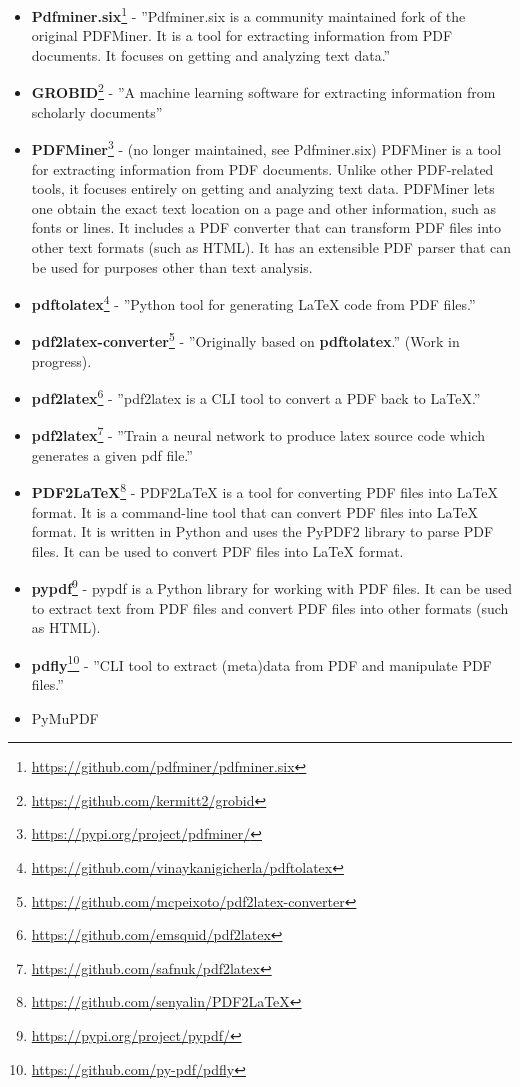 \begin{itemize}
    \item \textbf{Pdfminer.six}\footnote{\url{https://github.com/pdfminer/pdfminer.six}} - ''Pdfminer.six is a community maintained fork of the original PDFMiner. It is a tool for extracting information from PDF documents. It focuses on getting and analyzing text data.''
    \item \textbf{GROBID}\footnote{\url{https://github.com/kermitt2/grobid}} - ''A machine learning software for extracting information from scholarly documents''
    \item \textbf{PDFMiner}\footnote{\url{https://pypi.org/project/pdfminer/}} - (no longer maintained, see Pdfminer.six) PDFMiner is a tool for extracting information from PDF documents. Unlike other PDF-related tools, it focuses entirely on getting and analyzing text data. PDFMiner lets one obtain the exact text location on a page and other information, such as fonts or lines. It includes a PDF converter that can transform PDF files into other text formats (such as HTML). It has an extensible PDF parser that can be used for purposes other than text analysis.
    \item \textbf{pdftolatex}\footnote{\url{https://github.com/vinaykanigicherla/pdftolatex}} - ''Python tool for generating \LaTeX{} code from PDF files.''
    \item \textbf{pdf2latex-converter}\footnote{\url{https://github.com/mcpeixoto/pdf2latex-converter}} - ''Originally based on \textbf{pdftolatex}.'' (Work in progress).
    \item \textbf{pdf2latex}\footnote{\url{https://github.com/emsquid/pdf2latex}} - ''pdf2latex is a CLI tool to convert a PDF back to LaTeX.''
    \item \textbf{pdf2latex}\footnote{\url{https://github.com/safnuk/pdf2latex}} - ''Train a neural network to produce latex source code which generates a given pdf file.''
    \item \textbf{PDF2LaTeX}\footnote{\url{https://github.com/senyalin/PDF2LaTeX}} - PDF2LaTeX is a tool for converting PDF files into \LaTeX{} format. It is a command-line tool that can convert PDF files into \LaTeX{} format. It is written in Python and uses the PyPDF2 library to parse PDF files. It can be used to convert PDF files into \LaTeX{} format.
    \item \textbf{pypdf}\footnote{\url{https://pypi.org/project/pypdf/}} - pypdf is a Python library for working with PDF files. It can be used to extract text from PDF files and convert PDF files into other formats (such as HTML).
    \item \textbf{pdfly}\footnote{\url{https://github.com/py-pdf/pdfly}} - ''CLI tool to extract (meta)data from PDF and manipulate PDF files.''
    \item PyMuPDF
\end{itemize}

